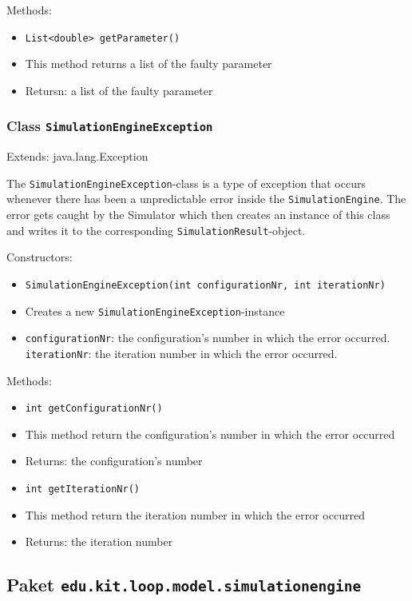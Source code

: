 \documentclass[parskip=full,11pt]{scrartcl}
\begin{document}
Methods:
\begin{itemize}\itemsep -10pt
	\item \texttt{List<double> getParameter()}
	\item[] This method returns a list of the faulty parameter
	\item[] Retursn: a list of the faulty parameter
\end{itemize}

\subsubsection{Class \texttt{SimulationEngineException}}
Extends: java.lang.Exception

The \texttt{SimulationEngineException}-class is a type of exception that occurs whenever there has been a unpredictable error inside the \texttt{SimulationEngine}. The error gets caught by the Simulator which then creates an instance of this class and writes it to the corresponding \texttt{SimulationResult}-object.

Constructors:
\begin{itemize}\itemsep -10pt
	\item \texttt{SimulationEngineException(int configurationNr, int iterationNr)}
	\item[] Creates a new \texttt{SimulationEngineException}-instance
	\item[] \texttt{configurationNr}: the configuration's number in which the error occurred.
	\texttt{iterationNr}: the iteration number in which the error occurred.
\end{itemize}

Methods:
\begin{itemize} \itemsep -10pt
	\item \texttt{int getConfigurationNr()}
	\item[] This method return the configuration's number in which the error occurred
	\item[] Returns: the configuration's number
	\item \texttt{int getIterationNr()}
	\item[] This method return the iteration number in which the error occurred
	\item[] Returns: the iteration number
\end{itemize}

\subsection{Paket \texttt{edu.kit.loop.model.simulationengine}}
\end{document}
